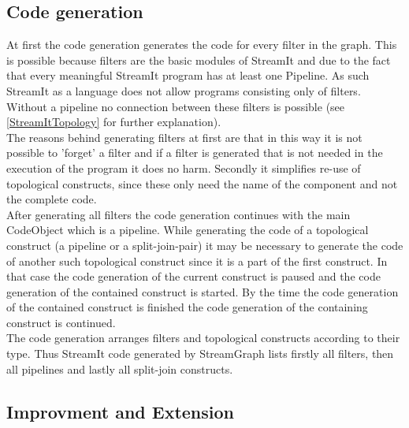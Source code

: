 \documentclass[journal]{IEEEtran}
\begin{document}
\subsection{Code generation}
\noindent At first the code generation generates the code for every
filter in the graph. This is possible because filters are the basic
modules of StreamIt and due to the fact that every meaningful StreamIt program
has at least one Pipeline. As such StreamIt as a language does not allow programs
consisting only of filters. Without a pipeline no connection between
these filters is possible (see \ref{StreamItTopology} for further
explanation). \\
The reasons behind generating filters at first are that in this 
way it is not possible to 'forget' a filter and if a filter is generated that 
is not needed in the execution of the program it does no harm. Secondly it 
simplifies re-use of topological constructs, since these 
only need the name of the component and not the complete code.\\

After generating all filters the code generation continues with the main
CodeObject which is a pipeline. While generating the code of a topological
construct (a pipeline or a split-join-pair) it may be necessary to generate the
code of another such topological construct since it is a part of the first
construct. In that case the code generation of the current construct is paused
and the code generation of the contained construct is started. By the time the
code generation of the contained construct is finished the code generation of
the containing construct is continued.\\

The code generation arranges filters and topological constructs according to
their type. Thus StreamIt code generated by StreamGraph lists firstly all
filters, then all pipelines and lastly all split-join constructs.\\

\subsection{Improvment and Extension}
\end{document}
